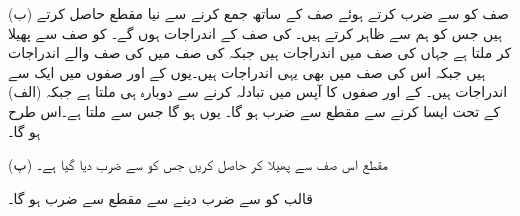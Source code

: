 (ب) \quad صف  کو  سے ضرب کرتے ہوئے صف  کے ساتھ جمع کرنے سے نیا مقطع حاصل کرتے ہیں جس کو ہم  سے ظاہر کرتے ہیں۔ کی  صف  کے اندراجات  ہوں گے۔ کو  صف سے پھیلا کر  ملتا ہے جہاں   کی صف  میں  اندراجات ہیں جبکہ  کی صف  میں  کی  صف  والے اندراجات  ہیں جبکہ اس کی  صف  میں بھی یہی  اندراجات ہیں۔یوں  کے  اور  صفوں میں ایک  سے  اندراجات ہیں۔ کے  اور  صفوں کا آپس میں تبادلہ کرنے سے دوبارہ  ہی ملتا ہے جبکہ (الف) کے تحت ایسا کرنے سے مقطع  سے ضرب ہو گا۔ یوں  ہو گا جس سے  ملتا ہے۔اس طرح  ہو گا۔

(پ) \quad مقطع اس صف سے پھیلا کر حاصل کریں جس کو  سے ضرب دیا گیا ہے۔

  قالب کو  سے ضرب دینے سے مقطع  سے ضرب ہو گا۔

